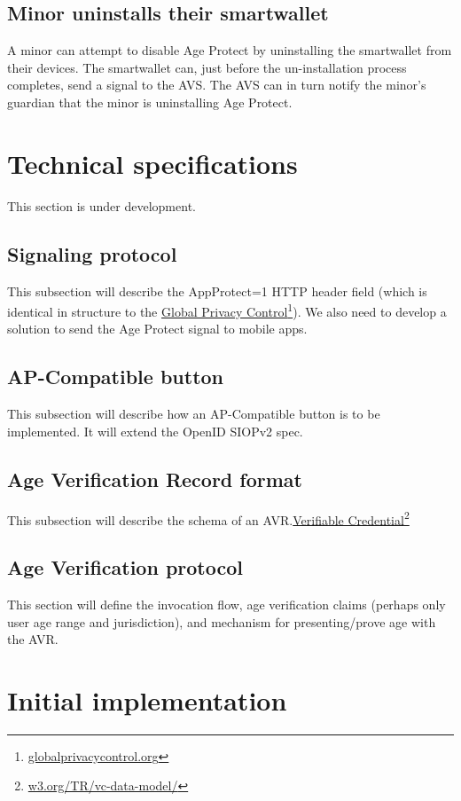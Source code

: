 \documentclass[11pt, oneside]{article}   	%
\newcommand{\hyperfootnote}[1][]{\def\ArgI{{#1}}\hyperfootnoteRelay}
\newcommand\hyperfootnoteRelay[2][]{\href{#1#2}{\ArgI}\footnote{\href{#1#2}{#2}}}
\begin{document}
\subsection{Minor uninstalls their smartwallet}

A minor can attempt to disable Age Protect by uninstalling the smartwallet from their devices. The smartwallet can, just before the un-installation process completes, send a signal to the AVS. The AVS can in turn notify the minor's guardian that the minor is uninstalling Age Protect.


\section{Technical specifications}

This section is under development.

\subsection{Signaling protocol}
This subsection will describe the AppProtect=1 HTTP header field (which is identical in structure to the \hyperfootnote[Global Privacy Control][https://]{globalprivacycontrol.org}). We also need to develop a solution to send the Age Protect signal to mobile apps.

\subsection{AP-Compatible button}
This subsection will describe how an AP-Compatible button is to be implemented. It will extend the OpenID SIOPv2 spec. 

\subsection{Age Verification Record format}
This subsection will describe the schema of an AVR.\hyperfootnote[Verifiable Credential][https://]{w3.org/TR/vc-data-model/}

\subsection{Age Verification protocol}
This section will define the invocation flow, age verification claims (perhaps only user age range and jurisdiction), and mechanism for presenting/prove age with the AVR. 

\section{Initial implementation}
\end{document}
